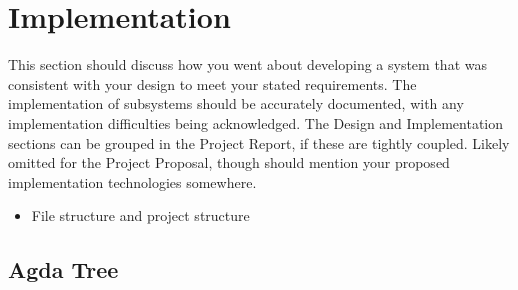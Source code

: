 
\chapter{Implementation} \label{ch:implementation}

This section should discuss how you went about developing a system that was
consistent with your design to meet your stated requirements. The
implementation of subsystems should be accurately documented, with any
implementation difficulties being acknowledged. The Design and Implementation
sections can be grouped in the Project Report, if these are tightly coupled.
Likely omitted for the Project Proposal, though should mention your proposed
implementation technologies somewhere.

\begin{itemize}
\item File structure and project structure
\end{itemize}

\section{Agda Tree}

